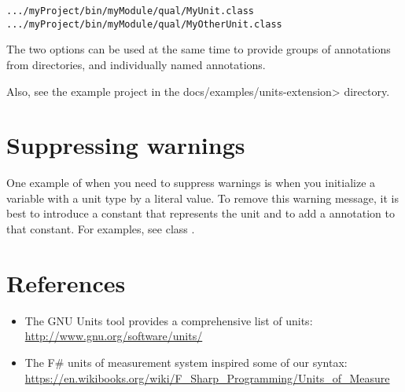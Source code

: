 \begin{itemize}
\begin{alltt}
  .../myProject/bin/myModule/qual/MyUnit.class
  .../myProject/bin/myModule/qual/MyOtherUnit.class
\end{alltt}

The two options can be used at the same time to provide groups of annotations
from directories, and individually named annotations.

\end{itemize}

Also, see the example project in the \<docs/examples/units-extension> directory.



\section{Suppressing warnings\label{units-suppressing}}

One example of when you need to suppress warnings is when you
initialize a variable with a unit type by a literal value.
To remove this warning message, it is best to introduce a
constant that represents the unit and to
add a 
annotation to that constant.
For examples, see class .


\section{References\label{units-references}}

\begin{itemize}
\item The GNU Units tool provides a comprehensive list of units:\\
  \url{http://www.gnu.org/software/units/}

\item The F\# units of measurement system inspired some of our syntax:\\
  \url{https://en.wikibooks.org/wiki/F_Sharp_Programming/Units_of_Measure}

\end{itemize}

